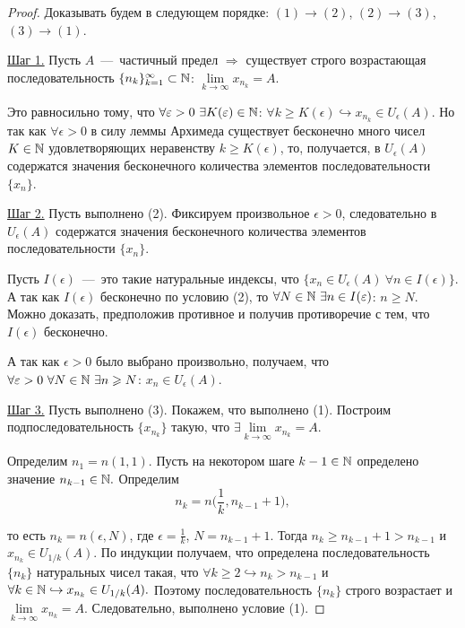 \begin{proof}
    Доказывать будем в следующем порядке: $(1) \to (2)$, $(2) \to (3)$, \newline $(3) \to (1)$.

    \underline{Шаг 1.} Пусть $A$~---~частичный предел $\Rightarrow$ существует строго возрастающая последовательность $\{ n_{k} \}^{\infty}_{k = 1} \subset \mathbb{N}$: $\lim\limits_{k\to \infty} x_{n_{k}} = A.$

    Это равносильно тому, что $\forall \varepsilon > 0 \  \exists K (\varepsilon) \in \mathbb{N}$: $\forall k \geq K (\epsilon) \hookrightarrow x_{n_{k}} \in U_{\epsilon} (A)$. Но так как $\forall \epsilon > 0$ в силу леммы Архимеда существует бесконечно много чисел $K \in \mathbb{N}$ удовлетворяющих неравенству $k \geq K (\epsilon)$, то, получается, в $U_{\epsilon} (A)$ содержатся значения бесконечного количества элементов последовательности $\{ x_{n} \}$.

    \underline{Шаг 2.} Пусть выполнено (2). Фиксируем произвольное $\epsilon > 0$, следовательно в $U_{\epsilon} (A)$ содержатся значения бесконечного количества элементов последовательности $\{ x_{n} \}$.

    Пусть $I (\epsilon)$~---~это такие натуральные индексы, что $\{ x_{n} \in U_{\epsilon} (A) \  \forall n \in I (\epsilon) \}$. А так как $I (\epsilon)$ бесконечно по условию (2), то $\forall N \in \mathbb{N} \  \exists n \in I (\varepsilon)$: $n \geq N$. Можно доказать, предположив противное и получив противоречие с тем, что $I (\epsilon)$ бесконечно.

    А так как $\epsilon > 0$ было выбрано произвольно, получаем, что $\forall \varepsilon > 0 \  \forall N \in \mathbb{N} \  \exists n \geqslant N$: $x_{n} \in U_{\epsilon} (A).$

    \underline{Шаг 3.} Пусть выполнено (3). Покажем, что выполнено (1). Построим подпоследовательность $\{ x_{n_{k}} \}$ такую, что $\exists \lim\limits_{k\to \infty} x_{n_{k}} = A$.

    Определим $n_{1} = n(1, 1)$. Пусть на некотором шаге $k - 1 \in \mathbb{N}$ определено значение $n_{k - 1} \in \mathbb{N}.$ Определим
    $$n_{k} = n \bigg( \frac{1}{k}, n_{k - 1} + 1 \bigg),$$

    то есть $n_{k} = n (\epsilon, N)$, где $\epsilon = \frac{1}{k}$, $N = n_{k - 1} + 1$. Тогда $n_{k} \geq n_{k - 1} + 1 > n_{k - 1}$ и $x_{n_{k}} \in U_{1 / k} (A)$. По индукции получаем, что определена последовательность $\{ n_{k} \}$ натуральных чисел такая, что $\forall k \geq 2 \hookrightarrow n_{k} > n_{k - 1}$ и $\forall k \in \mathbb{N} \hookrightarrow x_{n_{k}} \in U_{1 / k} (A).$ Поэтому последовательность $\{ n_{k} \}$ строго возрастает и $\lim\limits_{k\to \infty} x_{n_{k}} = A.$ Следовательно, выполнено условие (1).
\end{proof}
